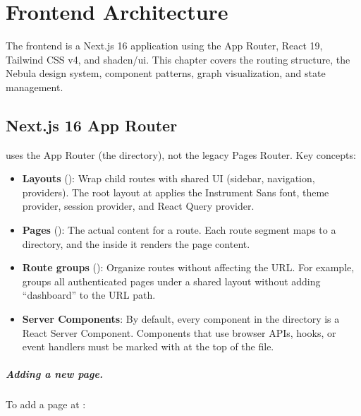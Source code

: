 \chapter{Frontend Architecture}
\label{ch:frontend-architecture}

The \sysname{} frontend is a Next.js 16 application using the App Router,
React 19, Tailwind CSS v4, and shadcn/ui.  This chapter covers the routing
structure, the Nebula design system, component patterns, graph visualization,
and state management.


\section{Next.js 16 App Router}
\label{sec:app-router}

\sysname{} uses the App Router (the  directory), not the legacy
Pages Router.  Key concepts:

\begin{itemize}
    \item \textbf{Layouts} (): Wrap child routes with shared
          UI (sidebar, navigation, providers).  The root layout at
           applies the Instrument Sans font, theme
          provider, session provider, and React Query provider.

    \item \textbf{Pages} (): The actual content for a route.
          Each route segment maps to a directory, and the 
          inside it renders the page content.

    \item \textbf{Route groups} (): Organize routes without
          affecting the URL.  For example,  groups
          all authenticated pages under a shared layout without adding
          ``dashboard'' to the URL path.

    \item \textbf{Server Components}: By default, every component in the
           directory is a React Server Component.  Components
          that use browser APIs, hooks, or event handlers must be marked
          with  at the top of the file.
\end{itemize}

\paragraph{Adding a new page.}
To add a page at :

